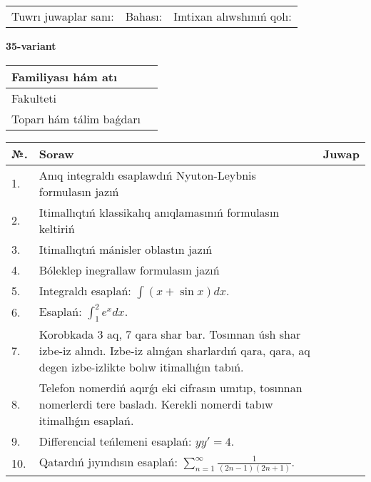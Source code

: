 \documentclass{article}
\begin{document}
\vspace{1cm}

\begin{tabular}{ c c c }
Tuwrı juwaplar sanı: \underline{\hspace{2cm}} & Bahası: \underline{\hspace{2cm}} & Imtixan alıwshınıń qolı: \underline{\hspace{2cm}} \\
\end{tabular}

\newpage

\begin{center}\textbf{35-variant}\end{center}

\bgroup
\def\arraystretch{1.5}
\begin{tabular}{ |m{6cm}|m{10cm}| }
  \hline
  Familiyası hám atı & \\
  \hline
  Fakulteti &\\
  \hline
  Toparı hám tálim baǵdarı & \\
  \hline
\end{tabular}
\egroup

\vspace{0.5cm}

\bgroup
\def\arraystretch{2}
\begin{tabular}{ |l|m{8cm}|m{7cm}| }
  \hline
  №. & Soraw & Juwap \\
  \hline
  1. & Anıq integraldı esaplawdıń Nyuton-Leybnis formulasın jazıń &  \\
  \hline
  2. & Itimallıqtıń klassikalıq anıqlamasınıń formulasın keltiriń &  \\
  \hline
  3. & Itimallıqtıń mánisler oblastın jazıń &  \\
  \hline
  4. & Bóleklep inegrallaw formulasın jazıń &  \\
  \hline
  5. & Integraldı esaplań: $\displaystyle\int (x + \sin x)dx$. &  \\
  \hline
  6. & Esaplań: $\displaystyle\int_{1}^{2}{e^{x}dx}$. &  \\
  \hline
  7. & Korobkada 3 aq, 7 qara shar bar. Tosınnan úsh shar izbe-iz alındı. Izbe-iz alınǵan sharlardıń qara, qara, aq degen izbe-izlikte bolıw itimallıǵın tabıń. &  \\
  \hline
  8. & Telefon nomerdiń aqırǵı eki cifrasın umıtıp, tosınnan nomerlerdi tere basladı. Kerekli nomerdi tabıw itimallıǵın esaplań. &  \\
  \hline
  9. & Differencial teńlemeni esaplań: $yy'= 4$. &  \\
  \hline
  10. & Qatardıń jıyındısın esaplań: $\displaystyle\sum_{n = 1}^{\infty}\frac{1}{(2n - 1)(2n + 1)}$. &  \\
  \hline
\end{tabular}
\egroup
\end{document}
